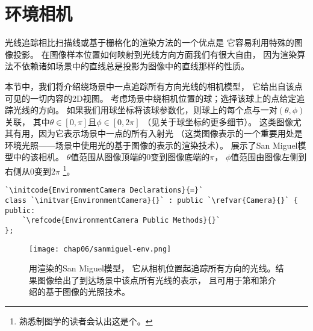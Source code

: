\section{环境相机}\label{sec:环境相机}
光线追踪相比扫描线或基于栅格化的渲染方法的一个优点是
它容易利用特殊的图像投影。
在图像样本位置如何映射到光线方向方面我们有很大自由，
因为渲染算法不依赖诸如场景中的直线总是投影为图像中的直线那样的性质。

本节中，我们将介绍绕场景中一点追踪所有方向光线的相机模型，
它给出自该点可见的一切内容的2D视图。
考虑场景中绕相机位置的球；选择该球上的点给定追踪光线的方向。
如果我们用球坐标将该球参数化，则球上的每个点与一对$(\theta,\phi)$关联，
其中$\theta\in[0,\pi]$且$\phi\in[0,2\pi]$
（见关于球坐标的更多细节）。
这类图像尤其有用，因为它表示场景中一点的所有入射光
（这类图像表示的一个重要用处是环境光照——场景中使用光的基于图像的表示的渲染技术）。
展示了San Miguel模型中的该相机。
$\theta$值范围从图像顶端的0变到图像底端的$\pi$，
$\phi$值范围由图像左侧到右侧从0变到$2\pi$
\footnote{熟悉制图学的读者会认出这是个。}。
\begin{lstlisting}
`\initcode{EnvironmentCamera Declarations}{=}`
class `\initvar{EnvironmentCamera}{}` : public `\refvar{Camera}{}` {
public:
    `\refcode{EnvironmentCamera Public Methods}{}`
};
\end{lstlisting}
\begin{figure}[htbp]
    \centering\texttt{[image: chap06/sanmiguel-env.png]}
    \caption{用渲染的San Miguel模型，
    它从相机位置起追踪所有方向的光线。结果图像给出了到达场景中该点所有光线的表示，
    且可用于第和第介绍的基于图像的光照技术。}
    \label{fig:6.14}
\end{figure}

